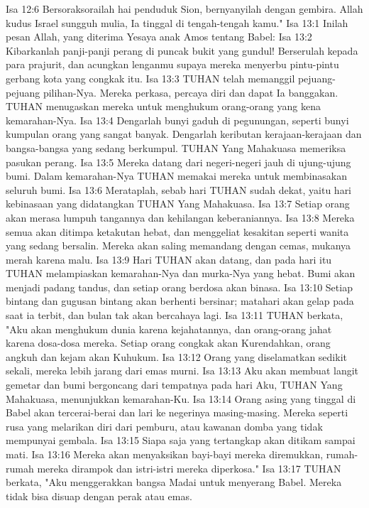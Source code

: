 Isa 12:6  Bersoraksorailah hai penduduk Sion, bernyanyilah dengan gembira. Allah kudus Israel sungguh mulia, Ia tinggal di tengah-tengah kamu."
Isa 13:1  Inilah pesan Allah, yang diterima Yesaya anak Amos tentang Babel:
Isa 13:2  Kibarkanlah panji-panji perang di puncak bukit yang gundul! Berserulah kepada para prajurit, dan acungkan lenganmu supaya mereka menyerbu pintu-pintu gerbang kota yang congkak itu.
Isa 13:3  TUHAN telah memanggil pejuang-pejuang pilihan-Nya. Mereka perkasa, percaya diri dan dapat Ia banggakan. TUHAN menugaskan mereka untuk menghukum orang-orang yang kena kemarahan-Nya.
Isa 13:4  Dengarlah bunyi gaduh di pegunungan, seperti bunyi kumpulan orang yang sangat banyak. Dengarlah keributan kerajaan-kerajaan dan bangsa-bangsa yang sedang berkumpul. TUHAN Yang Mahakuasa memeriksa pasukan perang.
Isa 13:5  Mereka datang dari negeri-negeri jauh di ujung-ujung bumi. Dalam kemarahan-Nya TUHAN memakai mereka untuk membinasakan seluruh bumi.
Isa 13:6  Merataplah, sebab hari TUHAN sudah dekat, yaitu hari kebinasaan yang didatangkan TUHAN Yang Mahakuasa.
Isa 13:7  Setiap orang akan merasa lumpuh tangannya dan kehilangan keberaniannya.
Isa 13:8  Mereka semua akan ditimpa ketakutan hebat, dan menggeliat kesakitan seperti wanita yang sedang bersalin. Mereka akan saling memandang dengan cemas, mukanya merah karena malu.
Isa 13:9  Hari TUHAN akan datang, dan pada hari itu TUHAN melampiaskan kemarahan-Nya dan murka-Nya yang hebat. Bumi akan menjadi padang tandus, dan setiap orang berdosa akan binasa.
Isa 13:10  Setiap bintang dan gugusan bintang akan berhenti bersinar; matahari akan gelap pada saat ia terbit, dan bulan tak akan bercahaya lagi.
Isa 13:11  TUHAN berkata, "Aku akan menghukum dunia karena kejahatannya, dan orang-orang jahat karena dosa-dosa mereka. Setiap orang congkak akan Kurendahkan, orang angkuh dan kejam akan Kuhukum.
Isa 13:12  Orang yang diselamatkan sedikit sekali, mereka lebih jarang dari emas murni.
Isa 13:13  Aku akan membuat langit gemetar dan bumi bergoncang dari tempatnya pada hari Aku, TUHAN Yang Mahakuasa, menunjukkan kemarahan-Ku.
Isa 13:14  Orang asing yang tinggal di Babel akan tercerai-berai dan lari ke negerinya masing-masing. Mereka seperti rusa yang melarikan diri dari pemburu, atau kawanan domba yang tidak mempunyai gembala.
Isa 13:15  Siapa saja yang tertangkap akan ditikam sampai mati.
Isa 13:16  Mereka akan menyaksikan bayi-bayi mereka diremukkan, rumah-rumah mereka dirampok dan istri-istri mereka diperkosa."
Isa 13:17  TUHAN berkata, "Aku menggerakkan bangsa Madai untuk menyerang Babel. Mereka tidak bisa disuap dengan perak atau emas.
